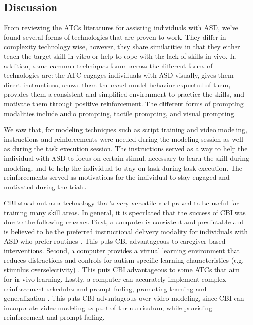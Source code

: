 \subsection{Discussion}
\label{Sec:AT4ASDDiscussion}
From reviewing the ATCs literatures for assisting individuals with ASD, we've found several forms of technologies that are proven to work.  They differ in complexity technology wise, however, they share similarities in that they either teach the target skill in-vitro or help to cope with the lack of skills in-vivo.  In addition, some common techniques found across the different forms of technologies are: the ATC engages individuals with ASD visually, gives them direct instructions, shows them the exact model behavior expected of them, provides them a consistent and simplified environment to practice the skills, and motivate them through positive reinforcement.  The different forms of prompting modalities include audio prompting, tactile prompting, and visual prompting.

We saw that, for modeling techniques such as script training and video modeling, instructions and reinforcements were needed during the modeling session as well as during the task execution session.  The instructions served as a way to help the individual with ASD to focus on certain stimuli necessary to learn the skill during modeling, and to help the individual to stay on task during task execution.  The reinforcements served as motivations for the individual to stay engaged and motivated during the trials.

CBI stood out as a technology that's very versatile and proved to be useful for training many skill areas.  In general, it is speculated that the success of CBI was due to the following reasons: First, a computer is consistent and predictable and is believed to be the preferred instructional delivery modality for individuals with ASD who prefer routines \cite{ramdoss2011use}.  This puts CBI advantageous to caregiver based interventions.  Second, a computer provides a virtual learning environment that reduces distractions and controls for autism-specific learning characteristics (e.g. stimulus overselectivity) \cite{lovaas1979stimulus}.  This puts CBI advantageous to some ATCs that aim for in-vivo learning.  Lastly, a computer can accurately implement complex reinforcement schedules and prompt fading, promoting learning and generalization \cite{ramdoss2011useb}.  This puts CBI advantageous over video modeling, since CBI can incorporate video modeling as part of the curriculum, while providing reinforcement and prompt fading.

